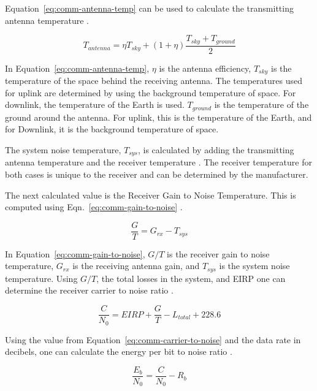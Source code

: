 \documentclass[12pt]{article}
\begin{document}
Equation~\ref{eq:comm-antenna-temp} can be used to calculate the transmitting antenna temperature \cite{pozar}.

\begin{equation}\label{eq:comm-antenna-temp}
T_{antenna} = \eta T_{sky} + (1 + \eta) \frac{T_{sky} + T_{ground}}{2} 
\end{equation}

In Equation~\ref{eq:comm-antenna-temp}, $\eta$ is the antenna efficiency, $T_{sky}$ is the temperature of the space behind the receiving antenna. The temperatures used for uplink are determined by using the background temperature of space. For downlink, the temperature of the Earth is used. $T_{ground}$ is the temperature of the ground around the antenna. For uplink, this is the temperature of the Earth, and for Downlink, it is the background temperature of space.

The system noise temperature, $T_{sys}$, is calculated by adding the transmitting antenna temperature and the receiver temperature \cite{pozar}. The receiver temperature for both cases is unique to the receiver and can be determined by the manufacturer.

The next calculated value is the Receiver Gain to Noise Temperature. This is computed using Eqn.~\ref{eq:comm-gain-to-noise} \cite[p.~477]{SMAD}.

\begin{equation}\label{eq:comm-gain-to-noise}
\frac{G}{T} =  G_{rx} - T_{sys} 
\end{equation}

In Equation~\ref{eq:comm-gain-to-noise}, $G/T$ is the receiver gain to noise temperature, $G_{rx}$ is the receiving antenna gain, and $T_{sys}$ is the system noise temperature. Using $G/T$, the total losses in the system, and EIRP one can determine the receiver carrier to noise ratio \cite[p.~477]{SMAD}.

\begin{equation}\label{eq:comm-carrier-to-noise}
\frac{C}{N_0} = EIRP + \frac{G}{T} - L_{total} + 228.6 
\end{equation}

Using the value from Equation~\ref{eq:comm-carrier-to-noise} and the data rate in decibels, one can calculate the energy per bit to noise ratio \cite[p.~478]{SMAD}.

\begin{equation}\label{eq:comm-energy-to-noise}
\frac{E_b}{N_0} = \frac{C}{N_0} - R_b 
\end{equation}
\end{document}
